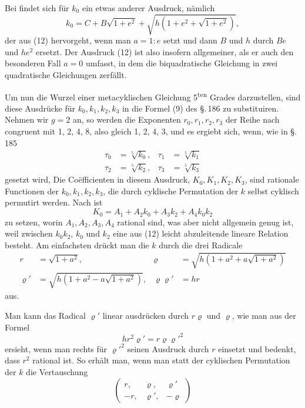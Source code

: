 
Bei  findet sich für $k_0$ ein etwas anderer Ausdruck,
nämlich
\[
k_0 = C + B\sqrt{1+e^2} + \sqrt{h\left(1+e^2+\sqrt{1+e^2}\right)},
\]
der aus (12) hervorgeht, wenn man $a = 1:e$ setzt und dann $B$ und $h$
durch $Be$ und $he^2$ ersetzt. Der Ausdruck (12) ist also insofern
allgemeiner, als er auch den besonderen Fall $a=0$ umfasst, in dem die
biquadratische Gleichung in zwei quadratische Gleichungen zerfällt.

Um nun die Wurzel einer metacyklischen Gleichung 5\textsuperscript{ten}
Grades darzustellen, sind diese Ausdrücke für $k_0, k_1, k_2, k_3$ in
die Formel (9) des \S.\,186 zu substituiren. Nehmen wir $g=2$ an, so
werden die Exponenten $r_0, r_1, r_2, r_3$ der Reihe nach congruent mit
1, 2, 4, 8, also gleich 1, 2, 4, 3, und es ergiebt sich, wenn, wie in
\S.\,185
\[
\begin{aligned}
\tau_0 &= \sqrt[5]{k_0}, & \tau_1 &= \sqrt[5]{k_1} \\
\tau_2 &= \sqrt[5]{k_2}, & \tau_3 &= \sqrt[5]{k_3}
\end{aligned}
\]
gesetzt wird,
Die Coëfficienten in diesem Ausdruck, $K_0, K_1, K_2, K_3$, sind
rationale Functionen der $k_0, k_1, k_2, k_3$, die durch cyklische
Permutation der $k$ selbst cyklisch permutirt werden. Nach 
ist
\[
K_0 = A_1 + A_2 k_0 + A_3 k_2 + A_4 k_0 k_2
\]
zu setzen, worin $A_1, A_2, A_3, A_4$ rational sind, was aber nicht
allgemein genug ist, weil zwischen $k_0 k_2$, $k_0$ und $k_2$ eine aus
(12) leicht abzuleitende lineare Relation besteht. Am einfachsten
drückt man die $k$ durch die drei Radicale
\[
\begin{aligned}
r &= \sqrt{1+a^2}, & \varrho &= \sqrt{h\left(1+a^2+a\sqrt{1+a^2}\right)} \\
\varrho' &= \sqrt{h\left(1+a^2-a\sqrt{1+a^2}\right)}, & \varrho\varrho' &= hr
\end{aligned}
\]
aus.

Man kann das Radical $\varrho'$ linear ausdrücken durch $r\varrho$ und
$\varrho$, wie man aus der Formel
\[
hr^2\varrho' = r\varrho\varrho'^2
\]
ersieht, wenn man rechts für $\varrho'^2$ seinen Ausdruck durch $r$
einsetzt und bedenkt, dass $r^2$ rational ist. So erhält man, wenn man
statt der cyklischen Permutation der $k$ die Vertauschung
\[
\begin{pmatrix}
r, & \varrho, & \varrho' \\
-r, & \varrho', & -\varrho
\end{pmatrix}
\]
